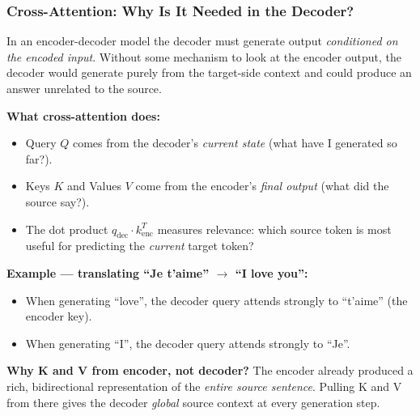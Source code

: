 \begin{frame}[fragile]\frametitle{Cross-Attention: Why Is It Needed in the Decoder?}

In an encoder-decoder model the decoder must generate output \emph{conditioned on the encoded input}. Without some mechanism to look at the encoder output, the decoder would generate purely from the target-side context and could produce an answer unrelated to the source.

\textbf{What cross-attention does:}
\begin{itemize}
\item Query $Q$ comes from the decoder's \emph{current state} (what have I generated so far?).
\item Keys $K$ and Values $V$ come from the encoder's \emph{final output} (what did the source say?).
\item The dot product $q_{\text{dec}} \cdot k_{\text{enc}}^T$ measures relevance: which source token is most useful for predicting the \emph{current} target token?
\end{itemize}

\textbf{Example --- translating ``Je t'aime'' $\to$ ``I love you'':}
\begin{itemize}
\item When generating ``love'', the decoder query attends strongly to ``t'aime'' (the encoder key).
\item When generating ``I'', the decoder query attends strongly to ``Je''.
\end{itemize}

\textbf{Why K and V from encoder, not decoder?}
The encoder already produced a rich, bidirectional representation of the \emph{entire source sentence}. Pulling K and V from there gives the decoder \emph{global} source context at every generation step.

\end{frame}

